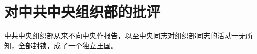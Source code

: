 \section[对中共中央组织部的批评（一九六二年八月十二日）]{对中共中央组织部的批评}


中共中央组织部从来不向中央作报告，以至中央同志对组织部同志的活动一无所知，全部封锁，成了一个独立王国。


